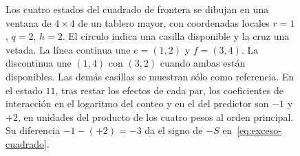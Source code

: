\begin{figure}[htbp]
\centering
{}
\caption{Los cuatro estados del cuadrado de frontera se dibujan en una ventana de
\(4\times4\) de un tablero mayor, con coordenadas locales \(r=1\), \(q=2\), \(h=2\).
El círculo indica una casilla disponible y la cruz una vetada. La línea continua une
\(e=(1,2)\) y \(f=(3,4)\). La discontinua une \((1,4)\) con \((3,2)\) cuando ambas
están disponibles. Las demás casillas se muestran sólo como referencia. En el estado \(11\),
tras restar los efectos de cada par, los coeficientes de interacción en el logaritmo del conteo
y en el del predictor son \(-1\) y \(+2\), en unidades del producto de los cuatro pesos al orden
principal. Su diferencia \(-1-(+2)=-3\) da el signo de \(-S\) en~\eqref{eq:exceso-cuadrado}.}
\label{fig:frontera}
\end{figure}
